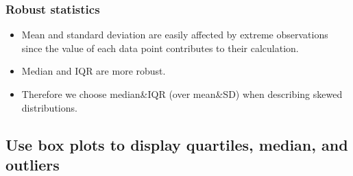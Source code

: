 \documentclass[11pt,containsverbatim,handout,xcolor=xelatex,dvipsnames,table]{beamer}
\begin{document}
\begin{frame}
\frametitle{Robust statistics}

\begin{itemize}

\item Mean and standard deviation are easily affected by extreme observations since the value of each data point contributes to their calculation.

\item Median and IQR are more robust.

\item Therefore we choose median\&IQR (over mean\&SD) when describing skewed distributions.

\end{itemize}


\end{frame}


\subsection{Use box plots to display quartiles, median, and outliers}
\label{mi4}

\end{document}
